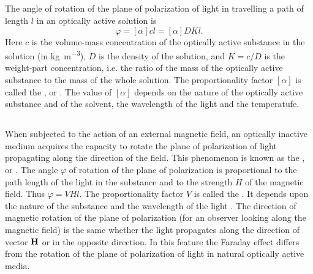 \subsection{}\label{35.5.4} The angle of rotation of the plane of polarization of light in travelling a path of length $l$ in an optically active solution is 
\begin{equation*}%
\varphi = [\alpha ] cl = [\alpha] DKl.
\end{equation*}
Here $c$ is the volume-mass concentration of the optically active substance in the solution (in \si{\kilo\gram\per\meter\cubed}), $D$ is the density of the
solution, and $K = c/D$ is the weight-part concentration, i.e.
the ratio of the mass of the optically active substance to the
mass of the whole solution. The proportionality factor $[\alpha]$ is called the , or  . The value of $[\alpha]$ depends on the nature of the optically active
substance and of the solvent, the wavelength of the light and
the temperatufe.

\subsection{}\label{35.5.5} When subjected to the action of an external magnetic field, an optically inactive medium acquires the capacity to rotate the plane of polarization of light propagating along the direction of the field. This phenomenon is known as the , or . The angle $\varphi$ of rotation of the plane of polarization is proportional to the path length of the light in the substance and to the strength $H$ of the magnetic field. Thus $\varphi = VHl$. The proportionality factor $V$ is called the . It depends upon the nature of the substance and the wavelength of the light
.
The direction of magnetic rotation of the plane of polarization (for an observer looking along the magnetic field) is the same whether the light propagates along the direction of vector $\vb{H}$ or in the opposite direction. In this feature the Faraday effect differs from the rotation of the plane of polarization of light in natural optically active media.
